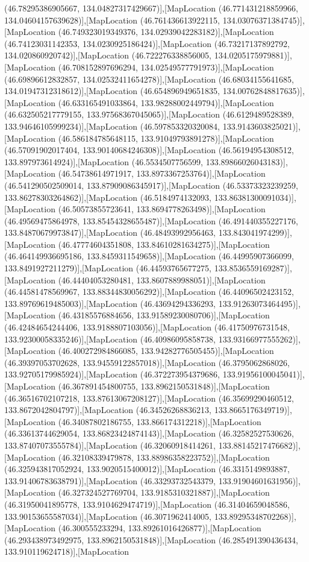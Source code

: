 (46.78295386905667, 134.04827317429667)],[MapLocation (46.771431218859966, 134.04604157639628)],[MapLocation (46.761436613922115, 134.03076371384745)],[MapLocation (46.749323019349376, 134.02939042283182)],[MapLocation (46.74123031142353, 134.0230925186424)],[MapLocation (46.73217137892792, 134.020860920742)],[MapLocation (46.722276338856005, 134.0205175979881)],[MapLocation (46.708152897696294, 134.02549577791973)],[MapLocation (46.69896612832857, 134.02532411654278)],[MapLocation (46.68034155641685, 134.01947312318612)],[MapLocation (46.654896949651835, 134.00762848817635)],[MapLocation (46.633165491033864, 133.98288002449794)],[MapLocation (46.632505217779155, 133.97568367045065)],[MapLocation (46.6129489528389, 133.94646105999234)],[MapLocation (46.597853320320084, 133.9143603825021)],[MapLocation (46.586184785648115, 133.91049793891278)],[MapLocation (46.57091902017404, 133.90140684246308)],[MapLocation (46.56194954308512, 133.897973614924)],[MapLocation (46.5534507756599, 133.89866026043183)],[MapLocation (46.54738614971917, 133.8973367253764)],[MapLocation (46.541290502509014, 133.87909086345917)],[MapLocation (46.53373323239259, 133.86278303264862)],[MapLocation (46.5184974132093, 133.86381300091034)],[MapLocation (46.50573855723641, 133.8694778263498)],[MapLocation (46.49569475864978, 133.85454328655487)],[MapLocation (46.491440355227176, 133.84870679973847)],[MapLocation (46.48493992956463, 133.843041974299)],[MapLocation (46.47774604351808, 133.84610281634275)],[MapLocation (46.464149936695186, 133.8459311549658)],[MapLocation (46.44995907366099, 133.8491927211279)],[MapLocation (46.44593765677275, 133.8536559169287)],[MapLocation (46.44404053280481, 133.8607889988051)],[MapLocation (46.44581478569967, 133.88344830056292)],[MapLocation (46.44096502423152, 133.89769619485003)],[MapLocation (46.43694294336293, 133.91263073464495)],[MapLocation (46.43185576884656, 133.91589230080706)],[MapLocation (46.42484654244406, 133.9188807103056)],[MapLocation (46.41750976731548, 133.92300058335246)],[MapLocation (46.40986095858738, 133.93166977555262)],[MapLocation (46.400272984866085, 133.94282776505455)],[MapLocation (46.39397053702628, 133.94559122857018)],[MapLocation (46.3795062868026, 133.92705179985924)],[MapLocation (46.372273954379686, 133.91956100045041)],[MapLocation (46.367891454800755, 133.8962150531848)],[MapLocation (46.36516702107218, 133.87613067208127)],[MapLocation (46.35699290460512, 133.8672042804797)],[MapLocation (46.34526268836213, 133.8665176349719)],[MapLocation (46.34087802186755, 133.866174312218)],[MapLocation (46.33613744629054, 133.86823424874143)],[MapLocation (46.32582527530626, 133.87407073555784)],[MapLocation (46.32060918414261, 133.88145217476682)],[MapLocation (46.32108339479878, 133.88986358223752)],[MapLocation (46.325943817052924, 133.9020515400012)],[MapLocation (46.3315149893887, 133.91406783638791)],[MapLocation (46.33293732543379, 133.91904601631956)],[MapLocation (46.327324527769704, 133.9185310321887)],[MapLocation (46.31950041895778, 133.9104629474719)],[MapLocation (46.31404659048586, 133.90153655587034)],[MapLocation (46.3071962414005, 133.89295348702268)],[MapLocation (46.300555233294, 133.89261016426877)],[MapLocation (46.293438973492975, 133.8962150531848)],[MapLocation (46.285491390436434, 133.910119624718)],[MapLocation 